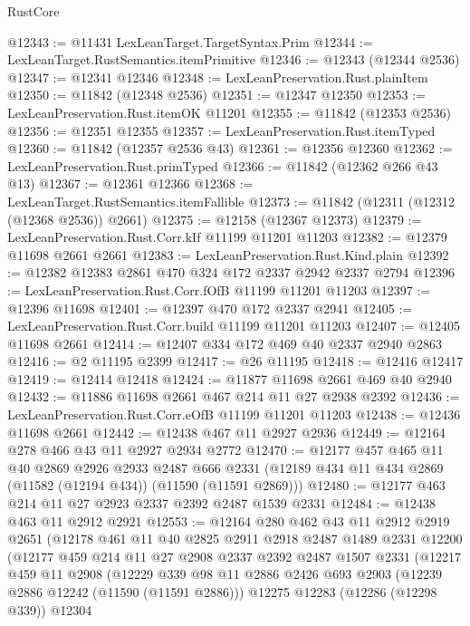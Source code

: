 \begin{lexlean}{RustCore}
\begin{coremodule}
@12343 := @11431 LexLeanTarget.TargetSyntax.Prim
@12344 := LexLeanTarget.RustSemantics.itemPrimitive
@12346 := @12343 (@12344 @2536)
@12347 := @12341 @12346
@12348 := LexLeanPreservation.Rust.plainItem
@12350 := @11842 (@12348 @2536)
@12351 := @12347 @12350
@12353 := LexLeanPreservation.Rust.itemOK @11201
@12355 := @11842 (@12353 @2536)
@12356 := @12351 @12355
@12357 := LexLeanPreservation.Rust.itemTyped
@12360 := @11842 (@12357 @2536 @43)
@12361 := @12356 @12360
@12362 := LexLeanPreservation.Rust.primTyped
@12366 := @11842 (@12362 @266 @43 @13)
@12367 := @12361 @12366
@12368 := LexLeanTarget.RustSemantics.itemFallible
@12373 := @11842 (@12311 (@12312 (@12368 @2536)) @2661)
@12375 := @12158 (@12367 @12373)
@12379 := LexLeanPreservation.Rust.Corr.kIf @11199 @11201 @11203
@12382 := @12379 @11698 @2661 @2661
@12383 := LexLeanPreservation.Rust.Kind.plain
@12392 := @12382 @12383 @2861 @470 @324 @172 @2337 @2942 @2337 @2794
@12396 := LexLeanPreservation.Rust.Corr.fOfB @11199 @11201 @11203
@12397 := @12396 @11698
@12401 := @12397 @470 @172 @2337 @2941
@12405 := LexLeanPreservation.Rust.Corr.build @11199 @11201 @11203
@12407 := @12405 @11698 @2661
@12414 := @12407 @334 @172 @469 @40 @2337 @2940 @2863
@12416 := @2 @11195 @2399
@12417 := @26 @11195
@12418 := @12416 @12417
@12419 := @12414 @12418
@12424 := @11877 @11698 @2661 @469 @40 @2940
@12432 := @11886 @11698 @2661 @467 @214 @11 @27 @2938 @2392
@12436 := LexLeanPreservation.Rust.Corr.eOfB @11199 @11201 @11203
@12438 := @12436 @11698 @2661
@12442 := @12438 @467 @11 @2927 @2936
@12449 := @12164 @278 @466 @43 @11 @2927 @2934 @2772
@12470 := @12177
    @457
    @465
    @11
    @40
    @2869
    @2926
    @2933
    @2487
    @666
    @2331
    (@12189 @434 @11 @434 @2869 (@11582 (@12194 @434)) (@11590 (@11591 @2869)))
@12480 := @12177 @463 @214 @11 @27 @2923 @2337 @2392 @2487 @1539 @2331
@12484 := @12438 @463 @11 @2912 @2921
@12553 := @12164
    @280
    @462
    @43
    @11
    @2912
    @2919
    @2651
    (@12178
      @461
      @11
      @40
      @2825
      @2911
      @2918
      @2487
      @1489
      @2331
      @12200
      (@12177
        @459
        @214
        @11
        @27
        @2908
        @2337
        @2392
        @2487
        @1507
        @2331
        (@12217
          @459
          @11
          @2908
          (@12229
            @339
            @98
            @11
            @2886
            @2426
            @693
            @2903
            (@12239 @2886 @12242 (@11590 (@11591 @2886)))
            @12275
            @12283
            (@12286 (@12298 @339))
            @12304

\end{coremodule}
\end{lexlean}
